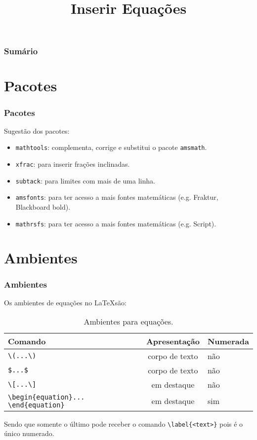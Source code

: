 \documentclass[brazilian]{beamer}
\title{Inserir Equações}
\begin{document}
    \frame{\titlepage}
    
    \begin{frame}[allowframebreaks]
        \frametitle{Sumário}
        \tableofcontents
    \end{frame}

\section{Pacotes}
\begin{frame}
    \frametitle{Pacotes}

    Sugestão dos pacotes:
    \begin{itemize}
        \item \texttt{mathtools}: complementa, corrige e substitui o pacote \texttt{amsmath}. 
        \item \texttt{xfrac}: para inserir frações inclinadas.
        \item \texttt{subtack}: para limites com mais de uma linha. 
        \item \texttt{amsfonts}: para ter acesso a mais fontes matemáticas (e.g. Fraktur, Blackboard bold).
        \item \texttt{mathrsfs}: para ter acesso a mais fontes matemáticas (e.g. Script).
    \end{itemize}

\end{frame}


\section{Ambientes}
\begin{frame}[fragile]
    \frametitle{Ambientes}
    Os ambientes de equações no \LaTeX são:

    \begin{table}
        \caption{Ambientes para equações.}
        \label{tab:Ambientes}
        \begin{tabular}{M{4.5cm}cl}
            Comando & Apresentação & Numerada \\ \hline
            \lstinline[style=myStyleLatex]!\(...\)! & corpo de texto & não \\ \hline
            \lstinline[style=myStyleLatex]!$...$! & corpo de texto & não \\ \hline
            \lstinline[style=myStyleLatex]!\[...\]! & em destaque & não \\ \hline
            \lstinline[style=myStyleLatex]!\begin{equation}... \end{equation}! & em destaque & sim \\ \hline
        \end{tabular}
    \end{table}
    Sendo que somente o último pode receber o comando \lstinline[style=myStyleLatex]!\label{<text>}! pois é o único numerado.

\end{frame}
\end{document}
